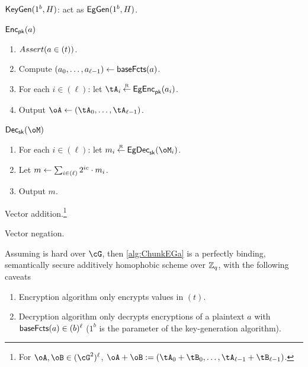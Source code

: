 \begin{algorithm}\label{alg:ChunkEGa}~
	
	\item[Key generation:] $\mathsf{KeyGen}(1^b,H)$: act as $\mathsf{EgGen}(1^b,H)$.
	
	\item[Encryption:] $\mathsf{Enc}_{\mathsf{pk}}(a)$ 
	\begin{enumerate}
		
		\item ${Assert(a\in (t))}$.
		
		\item Compute $(a_0,\ldots,a_{\ell-1}) \leftarrow \mathsf{baseFcts}(a)$. 
		
		\item For each $i\in (\ell)$: let $\tA_i \getsr \EgEnc_\pk(a_i)$.
		
		\item Output $\oA \asn (\tA_0,\ldots, \tA_{\ell-1})$.
		
	\end{enumerate}
	 
	\item[Decription:] $\Dec_\sk(\oM)$   
	\begin{enumerate}
		\item 	 For each $i\in (\ell)$: let $m_i \getsr \EgDec_\sk(\oM_i)$.
		
		\item Let  $m \leftarrow \sum_{i \in (\ell)}   2^{i c} \cdot  m_i $.
		
		\item Output $m$.
	\end{enumerate}
	
	\item[Addition:] Vector addition.\footnote{For $\oA,\oB \in (\cG^2)^\ell$, $\oA +\oB \eqdef (\tA_0+\tB_0,\ldots,\tA_{\ell-1}+\tB_{\ell-1})$.}
	
	\item[Minus:]  Vector negation.
	                     
	
\end{algorithm}


\begin{theorem}\label{thm:ChunkEG}
	Assuming \DDH is hard over $\cG$, then \cref{alg:ChunkEGa} is  a perfectly binding,  semantically secure additively homophobic scheme over ${\mathbb Z}_q$, with the following caveats
	\begin{enumerate}
		
		\item 	Encryption  algorithm only encrypts values in $(t)$.
		
		 
		\item Decryption algorithm only decrypts encryptions of a plaintext  $a$ with $\mathsf{baseFcts}(a)\in (b)^\ell$ ($1^b$ is the parameter of the key-generation algorithm).
	\end{enumerate}
	
\end{theorem}



